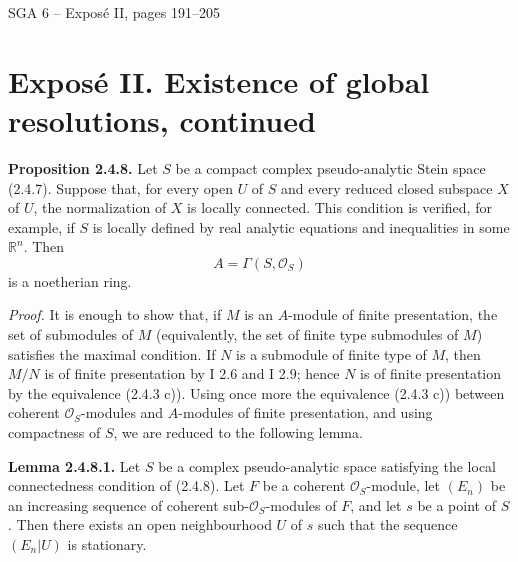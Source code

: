\documentclass[11pt]{article}
\newcommand{\Spec}{\operatorname{Spec}}
\begin{document}
\providecommand{\D}{\mathrm D}
\providecommand{\Kcat}{\mathrm K}
\providecommand{\Qcoh}{\operatorname{Qcoh}}
\providecommand{\Mod}{\operatorname{Mod}}
\providecommand{\Coh}{\operatorname{Coh}}
\providecommand{\Lib}{\operatorname{Lib}}
\providecommand{\Loclib}{\operatorname{Loclib}}
\providecommand{\Hom}{\operatorname{Hom}}
\providecommand{\Ext}{\operatorname{Ext}}
\providecommand{\Ob}{\operatorname{ob}}
\providecommand{\Spec}{\operatorname{Spec}}
\providecommand{\RHom}{\mathrm R\!\operatorname{Hom}}
\providecommand{\ilim}{\varinjlim}
\providecommand{\plim}{\varprojlim}
\providecommand{\qcoh}{\mathrm{qcoh}}
\providecommand{\Id}{\operatorname{Id}}
\begin{center}\Large SGA 6 -- Exposé II, pages 191--205\end{center}


\section*{Exposé II. Existence of global resolutions, continued}

\textbf{Proposition 2.4.8.} Let $S$ be a compact complex pseudo-analytic Stein space (2.4.7). Suppose that, for every open $U$ of $S$ and every reduced closed subspace $X$ of $U$, the normalization of $X$ is locally connected. This condition is verified, for example, if $S$ is locally defined by real analytic equations and inequalities in some $\mathbb R^n$. Then
\[
A=\Gamma(S,\mathcal O_S)
\]
is a noetherian ring.

\emph{Proof.} It is enough to show that, if $M$ is an $A$-module of finite presentation, the set of submodules of $M$ (equivalently, the set of finite type submodules of $M$) satisfies the maximal condition. If $N$ is a submodule of finite type of $M$, then $M/N$ is of finite presentation by I 2.6 and I 2.9; hence $N$ is of finite presentation by the equivalence (2.4.3 c)). Using once more the equivalence (2.4.3 c)) between coherent $\mathcal O_S$-modules and $A$-modules of finite presentation, and using compactness of $S$, we are reduced to the following lemma.

\textbf{Lemma 2.4.8.1.} Let $S$ be a complex pseudo-analytic space satisfying the local connectedness condition of (2.4.8). Let $F$ be a coherent $\mathcal O_S$-module, let $(E_n)$ be an increasing sequence of coherent sub-$\mathcal O_S$-modules of $F$, and let $s$ be a point of $S$. Then there exists an open neighbourhood $U$ of $s$ such that the sequence $(E_n|U)$ is stationary.
\end{document}
